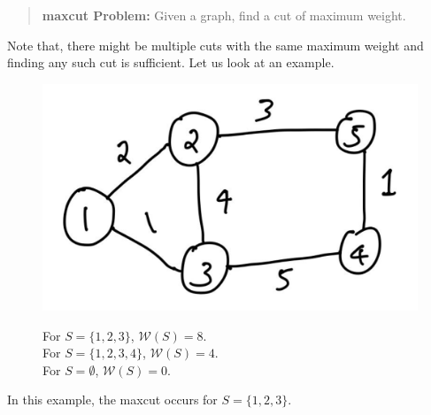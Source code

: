 \documentclass[12pt,
    driverfallback=dvipdfm,
 	openany,
    a4paper,
    toc=bibliography,
    twoside,
    numbers=noenddot]{article}              %
\begin{document}
\begin{quote}
 {\bf maxcut Problem:} Given a graph, find a cut of maximum weight.
\end{quote}
Note that, there might be multiple cuts with the same maximum weight and finding any such cut is sufficient. Let us look at an example.
\begin{example}
\begin{figure}[H]
\begin{minipage}{0.5\textwidth}
\includegraphics[scale=0.3]{eg1}
\end{minipage}
\hfill
\begin{minipage}{0.5\textwidth}
For $S = \{1,2, 3\}$, $\mathcal{W}(S) = 8$. \\
For $S = \{1,2, 3, 4\}$, $\mathcal{W}(S) = 4$. \\
For $S = \emptyset$, $\mathcal{W}(S) = 0$.
\end{minipage}
\end{figure}
In this example, the maxcut occurs for $S = \{1, 2, 3\}$.
\end{example}
\end{document}
